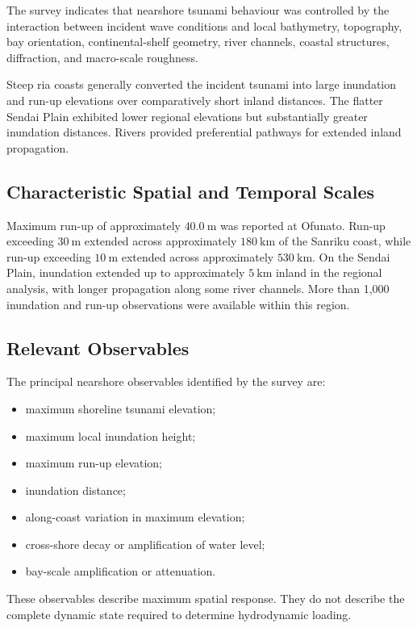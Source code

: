 The survey indicates that nearshore tsunami behaviour was controlled by the interaction between incident wave conditions and local bathymetry, topography, bay orientation, continental-shelf geometry, river channels, coastal structures, diffraction, and macro-scale roughness. 

Steep ria coasts generally converted the incident tsunami into large inundation and run-up elevations over comparatively short inland distances. The flatter Sendai Plain exhibited lower regional elevations but substantially greater inundation distances. Rivers provided preferential pathways for extended inland propagation.

\subsection{Characteristic Spatial and Temporal Scales}
\label{sec:res-phy-nrs-characteristic-spatial-temporal-scales}


Maximum run-up of approximately $40.0~\mathrm{m}$ was reported at Ofunato. Run-up exceeding $30~\mathrm{m}$ extended across approximately $180~\mathrm{km}$ of the Sanriku coast, while run-up exceeding $10~\mathrm{m}$ extended across approximately $530~\mathrm{km}$. On the Sendai Plain, inundation extended up to approximately $5~\mathrm{km}$ inland in the regional analysis, with longer propagation along some river channels. More than 1,000 inundation and run-up observations were available within this region.

\subsection{Relevant Observables}
\label{sec:res-phy-nrs-relevant-observables}


The principal nearshore observables identified by the survey are:
\begin{itemize}
  \item maximum shoreline tsunami elevation;
  \item maximum local inundation height;
  \item maximum run-up elevation;
  \item inundation distance;
  \item along-coast variation in maximum elevation;
  \item cross-shore decay or amplification of water level;
  \item bay-scale amplification or attenuation.
\end{itemize} These observables describe maximum spatial response. They do not describe the complete dynamic state required to determine hydrodynamic loading.

